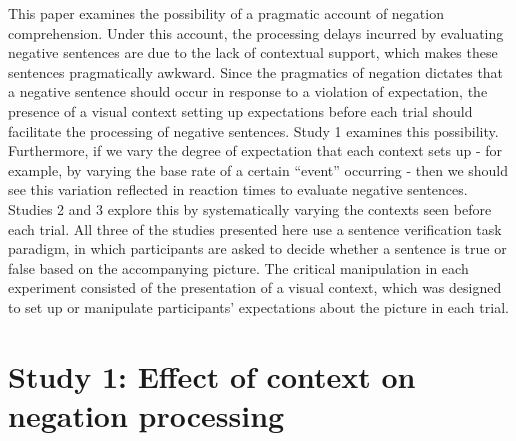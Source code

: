 \documentclass[man]{apa2}
\begin{document}
This paper examines the possibility of a pragmatic account of negation comprehension.  Under this account, the processing delays incurred by evaluating negative sentences \cite{carpenter1975, just1971, just1976, hclark1972} are due to the lack of contextual support, which makes these sentences pragmatically awkward.  Since the pragmatics of negation dictates that a negative sentence should occur in response to a violation of expectation, the presence of a visual context setting up expectations before each trial should facilitate the processing of negative sentences.  Study 1 examines this possibility.  Furthermore, if we vary the degree of expectation that each context sets up - for example, by varying the base rate of a certain ``event'' occurring - then we should see this variation reflected in reaction times to evaluate negative sentences.  Studies 2 and 3 explore this by systematically varying the contexts seen before each trial.  All three of the studies presented here use a sentence verification task paradigm, in which participants are asked to decide whether a sentence is true or false based on the accompanying picture.   The critical manipulation in each experiment consisted of the presentation of a visual context, which was designed to set up or manipulate participants' expectations about the picture in each trial.  

\section{Study  1: Effect of context on negation processing}
\end{document}
